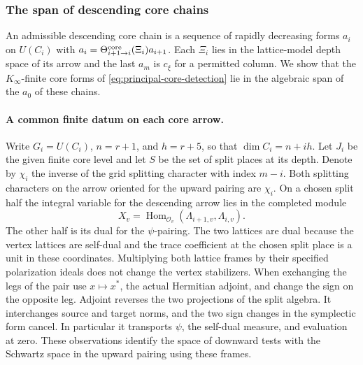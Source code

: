 \subsubsection{The span of descending core chains}
An admissible descending core chain is a sequence of rapidly
decreasing forms \(a_i\) on \(U(C_i)\) with
\(a_i=\Theta^{\rm core}_{i+1\to i}(\Xi_i)a_{i+1}\).
Each \(\Xi_i\) lies in the lattice-model depth space of its
arrow and the last \(a_m\) is \(c_\xi\) for a permitted
column. We show that the \(K_\infty\)-finite core forms
of \eqref{eq:principal-core-detection} lie in the algebraic
span of the \(a_0\) of these chains.

\paragraph{A common finite datum on each core arrow.}
Write \(G_i=U(C_i)\), \(n=r+1\), and \(h=r+5\), so that
\(\dim C_i=n+ih\). Let \(J_i\) be the given finite core level and
let \(S\) be the set of split places at its depth. Denote by
\(\chi_i\) the inverse of the grid splitting character with index
\(m-i\). Both splitting characters on the arrow oriented for the
upward pairing are \(\chi_i\). On a chosen split half the integral
variable for the descending arrow lies in the completed module
\[
 X_v=\operatorname{Hom}_{\mathcal O_v}
       (\Lambda_{i+1,v},\Lambda_{i,v}).
\]
The other half is its dual for the \(\psi\)-pairing. The two lattices
are dual because the vertex lattices are self-dual and the trace
coefficient at the chosen split place is a unit in these coordinates.
Multiplying both lattice frames by their specified polarization ideals
does not change the vertex stabilizers. When exchanging the legs of
the pair use \(x\mapsto x^*\), the actual Hermitian adjoint, and change
the sign on the opposite leg. Adjoint reverses the two projections
of the split algebra. It interchanges source and target norms, and
the two sign changes in the symplectic form cancel. In particular it
transports \(\psi\), the self-dual measure, and evaluation at zero.
These observations identify the space of downward tests with the
Schwartz space in the upward pairing using these frames.

